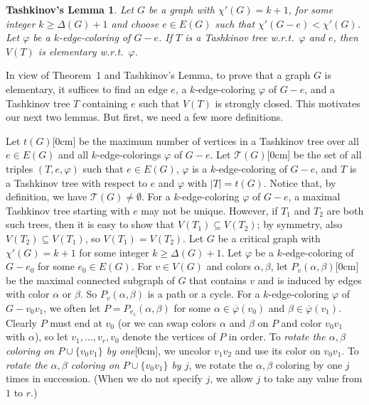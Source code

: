 \documentclass[12pt]{article}
\newcommand{\aside}[1]{\marginnote{\scriptsize{#1}}[0cm]}
\theoremstyle{plain}
\newtheorem*{lemmaA}{Tashkinov's Lemma}
\theoremstyle{definition}
\theoremstyle{remark}
\newcommand{\fancy}[1]{\mathcal{#1}}
\newcommand{\T}{\fancy{T}}
\newcommand{\card}[1]{\left|#1\right|}
\newcommand{\vph}{\varphi}
\newcommand{\vphn}{\overline{\varphi}}
\begin{document}
\begin{lemmaA}%
Let $G$ be a graph with $\chi'(G)=k+1$, for some integer $k\ge \Delta(G)+1$ and
choose $e\in E(G)$ such that $\chi'(G-e)<\chi'(G)$.  Let $\varphi$ be a
$k$-edge-coloring of $G-e$.  If $T$ is a Tashkinov tree w.r.t.~$\varphi$ and
$e$, then $V(T)$ is elementary w.r.t.~$\varphi$.
\end{lemmaA}

In view of Theorem~1 and Tashkinov's Lemma, to prove that a graph $G$ is elementary,
it suffices to find an edge $e$, a $k$-edge-coloring $\vph$ of $G-e$, and a
Tashkinov tree $T$ containing $e$ such that $V(T)$ is strongly closed.
This motivates our next two lemmas.  But first, we need a few more definitions.

Let $t(G)$\aside{$t(G)$} be the maximum number of vertices in a Tashkinov tree
over all $e \in E(G)$
and all $k$-edge-colorings $\vph$ of $G - e$.  Let $\T(G)$\aside{$\T(G)$} be
the set of all triples $(T,e,\vph)$ such that $e \in E(G)$, $\vph$ is a
$k$-edge-coloring of $G-e$, and $T$ is a Tashkinov tree with respect to $e$ and
$\vph$ with $\card{T} = t(G)$.  Notice that, by definition, we have $\T(G) \ne \emptyset$.
%
For a $k$-edge-coloring $\vph$ of $G-e$, a maximal Tashkinov tree
starting with $e$ may not be unique.  However, if $T_1$ and $T_2$ are both such
trees, then it is easy to show that $V(T_1)\subseteq V(T_2)$; by symmetry, also
$V(T_2)\subseteq V(T_1)$, so $V(T_1)=V(T_2)$.
%
Let $G$ be a critical graph with $\chi'(G) = k+1$ for some integer $k \ge \Delta(G) + 1$. 
Let $\varphi$ be a $k$-edge-coloring of $G - e_0$ for some $e_0 \in E(G)$.  
For $v \in V(G)$ and colors $\alpha, \beta$, let $P_v(\alpha,
\beta)$\aside{$P_v(\alpha,\beta)$} be the
maximal connected subgraph of $G$ that contains $v$ and is induced by edges with color
$\alpha$ or $\beta$.  So $P_v(\alpha, \beta)$ is a path or a cycle.
For a $k$-edge-coloring $\vph$ of $G-v_0v_1$, we often let
$P=P_{v_1}(\alpha,\beta)$ for some $\alpha\in\vphn(v_0)$ and
$\beta\in\vphn(v_1)$.  
Clearly $P$ must end at $v_0$ (or we can swap colors $\alpha$ and $\beta$ on
$P$ and color $v_0v_1$ with $\alpha$), so let $v_1,\ldots,v_r,v_0$ denote the
vertices of $P$ in order. 
To \emph{rotate the $\alpha,\beta$ coloring on $P\cup\{v_0v_1\}$ by
one}\aside{rotate coloring}, we
uncolor $v_1v_2$ and use its color on $v_0v_1$.  To \emph{rotate the
$\alpha,\beta$ coloring on $P\cup\{v_0v_1\}$ by $j$}, we rotate the
$\alpha,\beta$ coloring by one $j$ times in succession.
(When we do not specify $j$, we allow $j$ to take any value from $1$ to
$r$.)  
\end{document}
